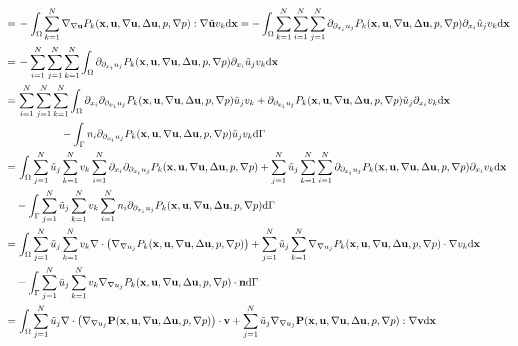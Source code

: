 \documentclass[oneside]{book}
\numberwithin{equation}{section}
\begin{document}
\begin{enumerate}[leftmargin=0in]
\begin{align*}
        =&\, -\int_\Omega \sum_{k=1}^N \nabla_{\nabla{\bf u}}P_k({\bf x},{\bf u},\nabla{\bf u},\Delta{\bf u},p,\nabla p):\nabla\tilde{\bf u}v_k{\rm d}{\bf x} = -\int_\Omega \sum_{k=1}^N\sum_{i=1}^N\sum_{j=1}^N \partial_{\partial_{x_i}u_j}P_k({\bf x},{\bf u},\nabla{\bf u},\Delta{\bf u},p,\nabla p)\partial_{x_i}\tilde{u}_jv_k{\rm d}{\bf x}\\
        =&\, -\sum_{i=1}^N\sum_{j=1}^N\sum_{k=1}^N \int_\Omega \partial_{\partial_{x_i}u_j}P_k({\bf x},{\bf u},\nabla{\bf u},\Delta{\bf u},p,\nabla p)\partial_{x_i}\tilde{u}_jv_k{\rm d}{\bf x}\\
        =&\, \sum_{i=1}^N\sum_{j=1}^N\sum_{k=1}^N \int_\Omega \partial_{x_i}\partial_{\partial_{x_i}u_j}P_k({\bf x},{\bf u},\nabla{\bf u},\Delta{\bf u},p,\nabla p)\tilde{u}_jv_k + \partial_{\partial_{x_i}u_j}P_k({\bf x},{\bf u},\nabla{\bf u},\Delta{\bf u},p,\nabla p)\tilde{u}_j\partial_{x_i}v_k{\rm d}{\bf x}\\
        &\hspace{15mm} -\int_\Gamma n_i\partial_{\partial_{x_i}u_j}P_k({\bf x},{\bf u},\nabla{\bf u},\Delta{\bf u},p,\nabla p)\tilde{u}_jv_k{\rm d}\Gamma\\
        =&\, \int_\Omega \sum_{j=1}^N \tilde{u}_j\sum_{k=1}^N v_k\sum_{i=1}^N \partial_{x_i}\partial_{\partial_{x_i}u_j}P_k({\bf x},{\bf u},\nabla{\bf u},\Delta{\bf u},p,\nabla p) + \sum_{j=1}^N \tilde{u}_j\sum_{k=1}^N\sum_{i=1}^N \partial_{\partial_{x_i}u_j}P_k({\bf x},{\bf u},\nabla{\bf u},\Delta{\bf u},p,\nabla p)\partial_{x_i}v_k{\rm d}{\bf x}\\
        & -\int_\Gamma \sum_{j=1}^N \tilde{u}_j\sum_{k=1}^N v_k\sum_{i=1}^N n_i\partial_{\partial_{x_i}u_j}P_k({\bf x},{\bf u},\nabla{\bf u},\Delta{\bf u},p,\nabla p){\rm d}\Gamma\\
        =&\, \int_\Omega \sum_{j=1}^N \tilde{u}_j\sum_{k=1}^N v_k\nabla\cdot\left(\nabla_{\nabla u_j}P_k({\bf x},{\bf u},\nabla{\bf u},\Delta{\bf u},p,\nabla p)\right) + \sum_{j=1}^N \tilde{u}_j\sum_{k=1}^N \nabla_{\nabla u_j}P_k({\bf x},{\bf u},\nabla{\bf u},\Delta{\bf u},p,\nabla p)\cdot\nabla v_k{\rm d}{\bf x}\\
        & -\int_\Gamma \sum_{j=1}^N \tilde{u}_j\sum_{k=1}^N v_k\nabla_{\nabla u_j}P_k({\bf x},{\bf u},\nabla{\bf u},\Delta{\bf u},p,\nabla p)\cdot{\bf n}{\rm d}\Gamma\\
        =&\, \int_\Omega \sum_{j=1}^N \tilde{u}_j\nabla\cdot\left(\nabla_{\nabla u_j}{\bf P}({\bf x},{\bf u},\nabla{\bf u},\Delta{\bf u},p,\nabla p)\right)\cdot{\bf v} + \sum_{j=1}^N \tilde{u}_j\nabla_{\nabla u_j}{\bf P}({\bf x},{\bf u},\nabla{\bf u},\Delta{\bf u},p,\nabla p):\nabla{\bf v}{\rm d}{\bf x}\\

\end{align*}
\end{enumerate}
\end{document}
